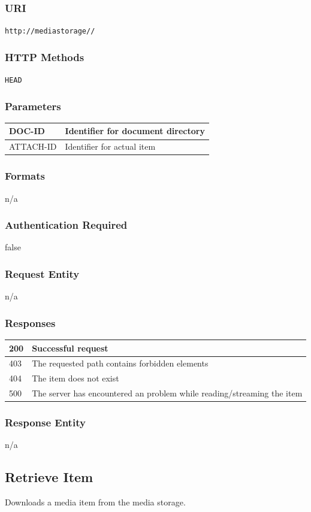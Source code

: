 \documentclass[10pt]{article}
\begin{document}
\subsubsection{URI}
\texttt{http://mediastorage//
}\subsubsection{HTTP Methods}
\texttt{HEAD}
\subsubsection{Parameters}
\begin{tabular}{|l|l|}\hline
DOC-ID & Identifier for document directory \\
\hline
ATTACH-ID & Identifier for actual item \\
\hline
\end{tabular}
\subsubsection{Formats}
n/a
\subsubsection{Authentication Required}
false
\subsubsection{Request Entity}
n/a
\subsubsection{Responses}
\begin{tabular}{|l|l|}\hline
200 & Successful request \\
\hline
403 & The requested path contains forbidden elements \\
\hline
404 & The item does not exist \\
\hline
500 & The server has encountered an problem while reading/streaming the item \\
\hline
\end{tabular}
\subsubsection{Response Entity}
n/a
\subsection{Retrieve Item}
Downloads a media item from the media storage.
\end{document}
